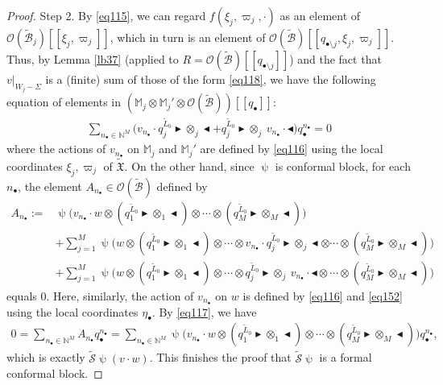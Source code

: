 \documentclass[12pt,b5paper,notitlepage]{report}
\theoremstyle{definition}
\theoremstyle{plain}
\newcommand{\fk}{\mathfrak}
\newcommand{\mc}{\mathcal}
\newcommand{\wtd}{\widetilde}
\newcommand{\scr}{\mathscr}
\newcommand{\blt}{\bullet}
\newcommand{\Mbb}{\mathbb M}
\newcommand{\Nbb}{\mathbb N}
\newcommand{\btl}{\blacktriangleleft}
\newcommand{\btr}{\blacktriangleright}
\numberwithin{equation}{section}
\begin{document}
\begin{proof}
Step 2. By \eqref{eq115}, we can regard $f(\xi_j,\varpi_j,\cdot)$ as an element of $\scr O(\wtd{\mc B}_j)[[\xi_j,\varpi_j]]$, which in turn is an element of $\scr O(\wtd{\mc B})[[q_{\blt\setminus j},\xi_j,\varpi_j]]$. Thus, by Lemma \ref{lb37} (applied to $R=\scr O(\wtd{\mc B})[[q_{\blt\setminus j}]]$) and the fact that $v|_{W_j-\Sigma}$ is a (finite) sum of those of the form \eqref{eq118}, we have the following equation of elements in $(\Mbb_j\otimes\Mbb_j'\otimes \scr O(\wtd{\mc B}))[[q_\blt]]$:
\begin{align}
\sum_{n_\blt\in\Nbb^M}\big(v_{n_\blt}\cdot q_j^{\wtd L_0}\btr\otimes_j\btl+ q_j^{\wtd L_0}\btr\otimes_j~ v_{n_\blt}\cdot\btl\big)q_\blt^{n_\blt} =0\label{eq117}
\end{align}
where the actions of $v_{n_\blt}$ on $\Mbb_j$ and $\Mbb_j'$ are defined by \eqref{eq116} using the  local coordinates $\xi_j,\varpi_j$ of $\wtd{\fk X}$. On the other hand, since $\uppsi$ is  conformal block, for each $n_\blt$, the element $A_{n_\blt}\in\scr O(\wtd{\mc B})$ defined by
\begin{align*}
A_{n_\blt}:=&\uppsi\Big(v_{n_\blt}\cdot w\otimes (q_1^{\wtd L_0}\btr\otimes_1\btl)\otimes\cdots\otimes (q_M^{\wtd L_0}\btr\otimes_M\btl)\Big)\nonumber\\
&+\sum_{j=1}^M\uppsi\Big(w\otimes (q_1^{\wtd L_0}\btr\otimes_1\btl)\otimes\cdots\otimes v_{n_\blt}\cdot q_j^{\wtd L_0}\btr\otimes_j\btl \otimes\cdots\otimes (q_M^{\wtd L_0}\btr\otimes_M\btl)\Big)\nonumber\\
&+\sum_{j=1}^M\uppsi\Big(w\otimes (q_1^{\wtd L_0}\btr\otimes_1\btl)\otimes\cdots\otimes  q_j^{\wtd L_0}\btr\otimes_j~v_{n_\blt}\cdot\btl \otimes\cdots\otimes (q_M^{\wtd L_0}\btr\otimes_M\btl)\Big)
\end{align*}
equals $0$. Here, similarly, the action of $v_{n_\blt}$ on $w$ is defined by \eqref{eq116} and \eqref{eq152} using the local coordinates $\eta_\blt$.  By \eqref{eq117}, we have
\begin{align*}
0=\sum_{n_\blt\in\Nbb^M}A_{n_\blt}q_\blt^{n_\blt}=\sum_{n_\blt\in\Nbb^M}\uppsi\Big(v_{n_\blt}\cdot w\otimes (q_1^{\wtd L_0}\btr\otimes_1\btl)\otimes\cdots\otimes (q_M^{\wtd L_0}\btr\otimes_M\btl)\Big)q_\blt^{n_\blt},
\end{align*}
which is exactly $\wtd{\mc S}\uppsi(v\cdot w)$. This finishes the proof that $\wtd{\mc S}\uppsi$ is a formal conformal block.
\end{proof}
\end{document}
